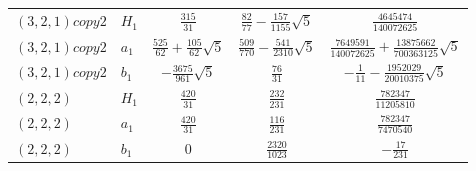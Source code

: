 \documentclass[11pt]{article}
\begin{document}
{\begin{longtable}{llccc}
$(3,2,1) copy 2$ & $H_1$ & $\frac{315}{31}$ & $\frac{82}{77}-\frac{157}{1155}\sqrt{5}$ & $\frac{4645474}{140072625}$ \\
$(3,2,1) copy 2$ & $a_1$ & $\frac{525}{62}+\frac{105}{62}\sqrt{5}$ & $\frac{509}{770}-\frac{541}{2310}\sqrt{5}$ & $\frac{7649591}{140072625}+\frac{13875662}{700363125}\sqrt{5}$ \\
$(3,2,1) copy 2$ & $b_1$ & $-\frac{3675}{961}\sqrt{5}$ & $\frac{76}{31}$ & $-\frac{1}{11}-\frac{1952029}{20010375}\sqrt{5}$ \\
$(2,2,2)$ & $H_1$ & $\frac{420}{31}$ & $\frac{232}{231}$ & $\frac{782347}{11205810}$ \\
$(2,2,2)$ & $a_1$ & $\frac{420}{31}$ & $\frac{116}{231}$ & $\frac{782347}{7470540}$ \\
$(2,2,2)$ & $b_1$ & 0 & $\frac{2320}{1023}$ & $-\frac{17}{231}$ \\
\end{longtable}}
\end{document}
